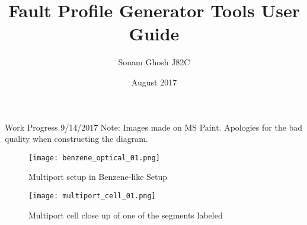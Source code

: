 \documentclass{article}
\title{Fault Profile Generator Tools User Guide}
\author{Sonam Ghosh J82C}
\date{August 2017}
\begin{document}
Work Progress 9/14/2017 \newline
Note: Images made on MS Paint. Apologies for the bad quality when constructing the diagram. \newline
\begin{figure}[h]
    \centering
    \texttt{[image: benzene\_optical\_01.png]}
    \caption{Multiport setup in Benzene-like Setup}
    \label{fig:my_label}
\end{figure}

\begin{figure}[!h]
    \centering
    \texttt{[image: multiport\_cell\_01.png]}
    \caption{Multiport cell close up of one of the segments labeled}
    \label{fig:my_label}
\end{figure}
\end{document}
